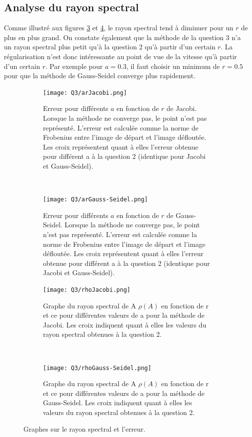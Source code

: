 \subsection{Analyse du rayon spectral}

Comme illustré aux figures \ref{fig:rhoj} et \ref{fig:rhogs}, le rayon spectral tend à diminuer pour un $r$ de plus en plus grand. On constate également que la méthode de la question 3 n'a un rayon spectral plus petit qu'à la question 2 qu'à partir d'un certain $r$.
La régularisation n'est donc intéressante au point de vue de la vitesse qu'à partir d'un certain $r$. Par exemple pour $a = 0.3$, il faut choisir un minimum de $r = 0.5$ pour que la méthode de Gauss-Seidel converge plus rapidement.

\begin{figure}
  \centering
  \begin{subfigure}[b]{0.45\textwidth}
    \texttt{[image: Q3/arJacobi.png]}
    \caption{Erreur pour différents $a$ en fonction de $r$ de Jacobi.
      Lorsque la méthode ne converge pas, le point n'est pas représenté.
      L'erreur est calculée comme la norme de Frobenius entre l'image de départ
      et l'image défloutée. Les croix représentent quant à elles l'erreur obtenue pour différent a à la question 2 (identique pour Jacobi et Gauss-Seidel).}
    \label{fig:arj}
  \end{subfigure}%
  ~
  \begin{subfigure}[b]{0.45\textwidth}
    \texttt{[image: Q3/arGauss-Seidel.png]}
    \caption{Erreur pour différents $a$ en fonction de $r$ de Gauss-Seidel.
      Lorsque la méthode ne converge pas, le point n'est pas représenté.
      L'erreur est calculée comme la norme de Frobenius entre l'image de départ
      et l'image défloutée. Les croix représentent quant à elles l'erreur obtenue pour différent a à la question 2 (identique pour Jacobi et Gauss-Seidel).}
    \label{fig:args}
  \end{subfigure}

  \begin{subfigure}[b]{0.45\textwidth}
    \texttt{[image: Q3/rhoJacobi.png]}
    \caption{Graphe du rayon spectral de A $\rho(A)$ en fonction de r et ce pour différentes valeurs de a pour la méthode de Jacobi. Les croix indiquent quant à elles les valeurs du rayon spectral obtenues à la question 2.}
    \label{fig:rhoj}
  \end{subfigure}%
  ~
  \begin{subfigure}[b]{0.45\textwidth}
    \texttt{[image: Q3/rhoGauss-Seidel.png]}
    \caption{Graphe du rayon spectral de A $\rho(A)$ en fonction de r et ce pour différentes valeurs de a pour la méthode de Gauss-Seidel. Les croix indiquent quant à elles les valeurs du rayon spectral obtenues à la question 2.}
    \label{fig:rhogs}
  \end{subfigure}
  \caption{Graphes sur le rayon spectral et l'erreur.}
  \label{fig:arrho}
\end{figure}

